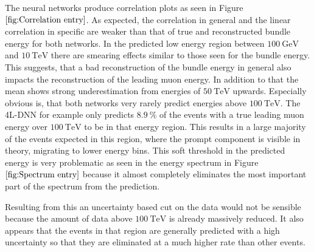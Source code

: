 \documentclass[
  tucolor,       %
  BCOR=12mm,     %
  parskip=half,  %
  open=any,      %
  cleardoublepage=plain,  %
]{tudothesis}
\begin{document}
The neural networks produce correlation plots as seen in Figure $\ref{fig:Correlation entry}$.
As expected, the correlation in general and the linear correlation in specific are weaker than that of true and reconstructed bundle energy for both networks.
In the predicted low energy region between $\SI{100}{\giga\electronvolt}$ and $\SI{10}{\tera\electronvolt}$ there are smearing effects similar to those seen for the bundle energy.
This suggests, that a bad reconstruction of the bundle energy in general also impacts the reconstruction of the leading muon energy.
In addition to that the mean shows strong underestimation from energies of $\SI{50}{\tera\electronvolt}$ upwards.
Especially obvious is, that both networks very rarely predict energies above $\SI{100}{\tera\electronvolt}$. The 4L-DNN for example only predicts $\SI{8.9}{\percent}$ of the events with a true leading muon energy over $\SI{100}{\tera\electronvolt}$ to be in that energy region.
This results in a large majority of the events expected in this region, where the prompt component is visible in theory, migrating to lower energy bins.
This soft threshold in the predicted energy is very problematic as seen in the energy spectrum in Figure $\ref{fig:Spectrum entry}$ because it almost completely eliminates the most important part of the spectrum from the prediction.

Resulting from this an uncertainty based cut on the data would not be sensible because the amount of data above $\SI{100}{\tera\electronvolt}$ is already massively reduced. It also appears that the events in that region are generally predicted with a high uncertainty so that they are eliminated at a much higher rate than other events.
\end{document}
